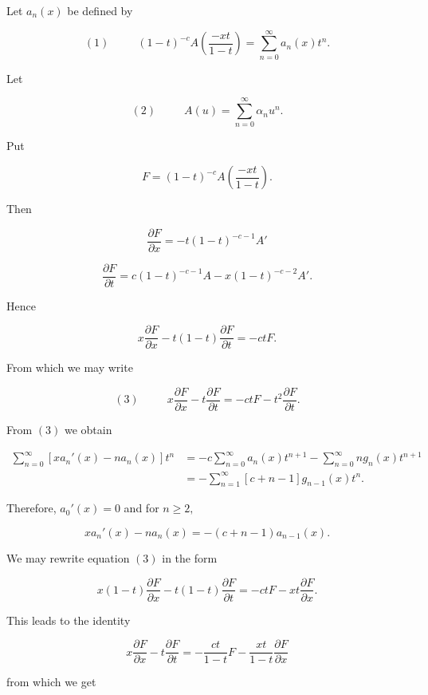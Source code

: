 \begin{solution}
Let $a_n(x)$ be defined by

$$(1) \hspace{30pt} (1-t)^{-c} A \left( \dfrac{-xt}{1-t} \right) = \displaystyle\sum_{n=0}^{\infty} a_n(x)t^n.$$

Let

$$(2) \hspace{30pt} A(u) = \displaystyle\sum_{n=0}^{\infty} \alpha_n u^n.$$

Put

$$F = (1-t)^{-c} A \left( \dfrac{-xt}{1-t} \right).$$

Then

$$\dfrac{\partial F}{\partial x} = -t(1-t)^{-c-1} A'$$

$$\dfrac{\partial F}{\partial t} = c(1-t)^{-c-1} A - x(1-t)^{-c-2} A'.$$

Hence

$$x \dfrac{\partial F}{\partial x} - t(1-t) \dfrac{\partial F}{\partial t} = -ctF.$$

From which we may write

$$(3) \hspace{30pt} x \dfrac{\partial F}{\partial x} - t \dfrac{\partial F}{\partial t} = -ctF - t^2 \dfrac{\partial F}{\partial t}.$$

From $(3)$ we obtain 

$$\begin{array}{ll}
\displaystyle\sum_{n=0}^{\infty} [xa_n'(x) - na_n(x)]t^n &= - c \displaystyle\sum_{n=0}^{\infty} a_n(x) t^{n+1} - \displaystyle\sum_{n=0}^{\infty} n g_n(x) t^{n+1} \\
&= - \displaystyle\sum_{n=1}^{\infty} [c+n-1] g_{n-1}(x) t^n.
\end{array}$$

Therefore, $a_0'(x) =0$ and for $n \geq 2,$

$$x a_n'(x) - na_n(x) = -(c+n-1)a_{n-1}(x).$$

We may rewrite equation $(3)$ in the form

$$x(1-t) \dfrac{\partial F}{\partial x} - t(1-t) \dfrac{\partial F}{\partial t} = -ctF - xt \dfrac{\partial F}{\partial x}.$$

This leads to the identity

$$x \dfrac{\partial F}{\partial x} - t \dfrac{\partial F}{\partial t} = -\dfrac{ct}{1-t} F - \dfrac{xt}{1-t} \dfrac{\partial F}{\partial x}$$

from which we get


\end{solution}
